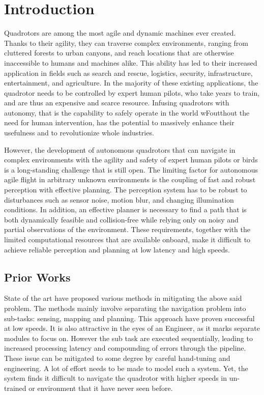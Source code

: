 \clearpage
\chapter{Introduction}

Quadrotors are among the most agile and dynamic machines ever created. Thanks to their agility, they can traverse complex environments, ranging from cluttered forests to urban canyons, and reach
locations that are otherwise inaccessible to humans and machines alike.
 This ability has led to their increased application in fields such as search and
rescue, logistics, security, infrastructure, entertainment, and agriculture. In the majority of these existing applications, the quadrotor needs to be controlled by expert human pilots, who take years to train,
and are thus an expensive and scarce resource. Infusing quadrotors
with autonomy, that is the capability to safely operate in the world wFoutthout the need for human intervention, has the potential to massively
enhance their usefulness and to revolutionize whole industries. 

However, the development of autonomous quadrotors that can navigate in
complex environments with the agility and safety of expert human pilots or birds is a long-standing challenge that is still open. The limiting factor for autonomous agile flight in arbitrary unknown
environments is the coupling of fast and robust perception with effective
planning. The perception system has to be robust to disturbances such
as sensor noise, motion blur, and changing illumination conditions. In
addition, an effective planner is necessary to find a path that is both
dynamically feasible and collision-free while relying only on noisy and
partial observations of the environment. These requirements, together
with the limited computational resources that are available onboard,
make it difficult to achieve reliable perception and planning at low
latency and high speeds.

\section{Prior Works}
State of the art have proposed various methods in mitigating the above said problem. The methods mainly involve separating the navigation problem into sub-tasks: sensing, mapping and planning. This approach have proven successful at low speeds. It is also attractive in the eyes of an Engineer, as it marks separate modules to focus on. However the sub task are executed sequentially, leading to increased processing latency and compounding of errors through the pipeline. These issue can be mitigated to some degree by careful hand-tuning and engineering. A lot of effort needs to be made to model such a system. Yet, the system finds it difficult to navigate the quadrotor with higher speeds in un-trained or environment that it have never seen before.

